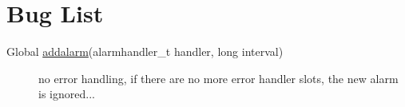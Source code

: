 \hypertarget{bug}{}\section{Bug List}\label{bug}
\label{bug__bug000001}
\hypertarget{bug__bug000001}{}
 \begin{description}
\item[Global \hyperlink{mainloop__good_8c_a29}{addalarm}(alarmhandler\_\-t handler, long interval) ]no error handling, if there are no more error handler slots, the new alarm is ignored... \end{description}
